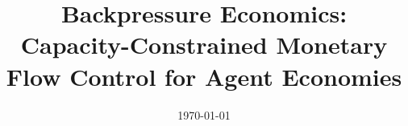 \documentclass[11pt]{article}
\title{\textbf{Backpressure Economics:} \\
Capacity-Constrained Monetary Flow Control for Agent Economies}
\author{}
\date{\today}
\theoremstyle{definition}
\theoremstyle{remark}
\begin{document}
\maketitle

\begin{abstract}

\end{abstract}


















\end{document}
